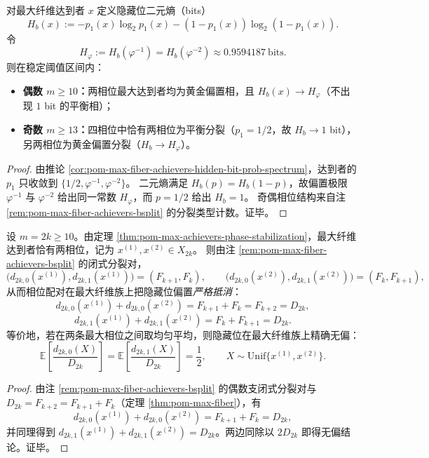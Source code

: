 \begin{corollary}\label{cor:pom-max-fiber-achievers-hidden-bit-entropy}
对最大纤维达到者 \(x\) 定义隐藏位二元熵（bits）
\[
H_b(x):=-p_1(x)\log_2 p_1(x)-(1-p_1(x))\log_2(1-p_1(x)).
\]
令
\[
H_\varphi:=H_b(\varphi^{-1})=H_b(\varphi^{-2})\approx 0.9594187\ \text{bits}.
\]
则在稳定阈值区间内：
\begin{itemize}
  \item \textbf{偶数 \(m\ge 10\)：}两相位最大达到者均为黄金偏置相，且 \(H_b(x)\to H_\varphi\)（不出现 \(1\) bit 的平衡相）；
  \item \textbf{奇数 \(m\ge 13\)：}四相位中恰有两相位为平衡分裂（\(p_1=1/2\)，故 \(H_b\to 1\) bit），另两相位为黄金偏置分裂（\(H_b\to H_\varphi\)）。
\end{itemize}
\end{corollary}
\begin{proof}
由推论 \ref{cor:pom-max-fiber-achievers-hidden-bit-prob-spectrum}，达到者的 \(p_1\) 只收敛到 \(\{1/2,\varphi^{-1},\varphi^{-2}\}\)。
二元熵满足 \(H_b(p)=H_b(1-p)\)，故偏置极限 \(\varphi^{-1}\) 与 \(\varphi^{-2}\) 给出同一常数 \(H_\varphi\)，而 \(p=1/2\) 给出 \(H_b=1\)。
奇偶相位结构来自注 \ref{rem:pom-max-fiber-achievers-bsplit} 的分裂类型计数。证毕。
\end{proof}

\begin{corollary}\label{cor:pom-max-fiber-hidden-bit-unbiased}
设 \(m=2k\ge 10\)。由定理 \ref{thm:pom-max-achievers-phase-stabilization}，最大纤维达到者恰有两相位，记为 \(x^{(1)},x^{(2)}\in X_{2k}\)。
则由注 \ref{rem:pom-max-fiber-achievers-bsplit} 的闭式分裂对，
\[
\bigl(d_{2k,0}(x^{(1)}),d_{2k,1}(x^{(1)})\bigr)=(F_{k+1},F_k),
\qquad
\bigl(d_{2k,0}(x^{(2)}),d_{2k,1}(x^{(2)})\bigr)=(F_k,F_{k+1}),
\]
从而相位配对在最大纤维族上把隐藏位偏置\emph{严格抵消}：
\[
d_{2k,0}(x^{(1)})+d_{2k,0}(x^{(2)})=F_{k+1}+F_k=F_{k+2}=D_{2k},
\]
\[
d_{2k,1}(x^{(1)})+d_{2k,1}(x^{(2)})=F_k+F_{k+1}=D_{2k}.
\]
等价地，若在两条最大相位之间取均匀平均，则隐藏位在最大纤维族上精确无偏：
\[
\mathbb{E}\!\left[\frac{d_{2k,0}(X)}{D_{2k}}\right]
=\mathbb{E}\!\left[\frac{d_{2k,1}(X)}{D_{2k}}\right]
=\frac12,\qquad X\sim\mathrm{Unif}\{x^{(1)},x^{(2)}\}.
\]
\end{corollary}

\begin{proof}
由注 \ref{rem:pom-max-fiber-achievers-bsplit} 的偶数支闭式分裂对与 \(D_{2k}=F_{k+2}=F_{k+1}+F_k\)（定理 \ref{thm:pom-max-fiber}），有
\[
d_{2k,0}(x^{(1)})+d_{2k,0}(x^{(2)})=F_{k+1}+F_k=D_{2k},
\]
并同理得到 \(d_{2k,1}(x^{(1)})+d_{2k,1}(x^{(2)})=D_{2k}\)。两边同除以 \(2D_{2k}\) 即得无偏结论。证毕。
\end{proof}

